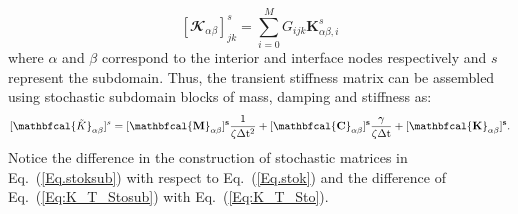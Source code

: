 \documentclass{article}
\begin{document}
\begin{equation}\label{Eq.stoksub}
[\mathbfcal{K}_{\alpha \beta}]_{jk} ^s  = \sum_{i=0} ^{M} G_{ijk} \mathbf{K}_{\alpha \beta,i} ^s
\end{equation}
where $\alpha$ and $\beta$ correspond to the interior and interface nodes respectively and $s$ represent the subdomain.
Thus, the transient stiffness matrix can be assembled using stochastic subdomain blocks of mass, damping and stiffness as:
\begin{equation}\label{Eq:K_T_Stosub}
[\mathbfcal{\tilde{{K}}}_{\alpha \beta}] ^s = [\bf{\mathbfcal{M}}_{\alpha \beta}] ^s \frac{\mathrm{1}}{\zeta \mathrm{\Delta t^2}} + [\bf{\mathbfcal{C}}_{\alpha \beta}] ^s  \frac{\gamma}{\zeta \mathrm{\Delta t} } + [{\mathbfcal{K}}_{\alpha \beta}] ^s.	
\end{equation}
Notice the difference in the construction of stochastic matrices in Eq.~(\ref{Eq.stoksub}) with respect to Eq.~(\ref{Eq.stok}) and the difference of Eq.~(\ref{Eq:K_T_Stosub}) with Eq.~(\ref{Eq:K_T_Sto}).
\end{document}
